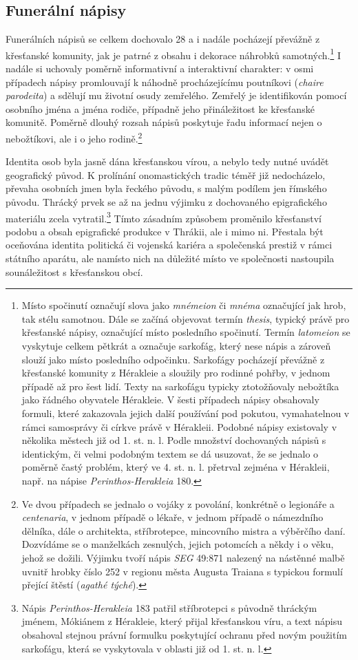 \subsection[funerální-nápisy-18]{Funerální nápisy}

Funerálních nápisů se celkem dochovalo 28 a i nadále pocházejí převážně z křesťanské komunity, jak je patrné z obsahu i dekorace náhrobků samotných.\footnote{Místo spočinutí označují slova jako {\em mnémeion} či {\em mnéma} označující jak hrob, tak stélu samotnou. Dále se začíná objevovat termín {\em thesis}, typický právě pro křesťanské nápisy, označující místo posledního spočinutí. Termín {\em latomeion} se vyskytuje celkem pětkrát a označuje sarkofág, který nese nápis a zároveň slouží jako místo posledního odpočinku. Sarkofágy pocházejí převážně z křesťanské komunity z Hérakleie a sloužily pro rodinné pohřby, v jednom případě až pro šest lidí. Texty na sarkofágu typicky ztotožňovaly nebožtíka jako řádného obyvatele Hérakleie. V šesti případech nápisy obsahovaly formuli, které zakazovala jejich další používání pod pokutou, vymahatelnou v rámci samosprávy či církve právě v Hérakleii. Podobné nápisy existovaly v několika městech již od 1. st. n. l. Podle množství dochovaných nápisů s identickým, či velmi podobným textem se dá usuzovat, že se jednalo o poměrně častý problém, který ve 4. st. n. l. přetrval zejména v Hérakleii, např. na nápise {\em Perinthos-Herakleia} 180.} I nadále si uchovaly poměrně informativní a interaktivní charakter: v osmi případech nápisy promlouvají k náhodně procházejícímu poutníkovi ({\em chaire parodeita}) a sdělují mu životní osudy zemřelého. Zemřelý je identifikován pomocí osobního jména a jména rodiče, případně jeho přináležitost ke křesťanské komunitě. Poměrně dlouhý rozsah nápisů poskytuje řadu informací nejen o nebožtíkovi, ale i o jeho rodině.\footnote{Ve dvou případech se jednalo o vojáky z povolání, konkrétně o legionáře a {\em centenaria}, v jednom případě o lékaře, v jednom případě o námezdního dělníka, dále o architekta, stříbrotepce, mincovního mistra a výběrčího daní. Dozvídáme se o manželkách zesnulých, jejich potomcích a někdy i o věku, jehož se dožili. Výjimku tvoří nápis {\em SEG} 49:871 nalezený na nástěnné malbě uvnitř hrobky číslo 252 v regionu města Augusta Traiana s typickou formulí přející štěstí ({\em agathé týché}).}

Identita osob byla jasně dána křesťanskou vírou, a nebylo tedy nutné uvádět geografický původ. K prolínání onomastických tradic téměř již nedocházelo, převaha osobních jmen byla řeckého původu, s malým podílem jen římského původu. Thrácký prvek se až na jednu výjimku z dochovaného epigrafického materiálu zcela vytratil.\footnote{Nápis {\em Perinthos-Herakleia} 183 patřil stříbrotepci s původně thráckým jménem, Mókiánem z Hérakleie, který přijal křesťanskou víru, a text nápisu obsahoval stejnou právní formulku poskytující ochranu před novým použitím sarkofágu, která se vyskytovala v oblasti již od 1. st. n. l.} Tímto zásadním způsobem proměnilo křesťanství podobu a obsah epigrafické produkce v Thrákii, ale i mimo ni. Přestala být oceňována identita politická či vojenská kariéra a společenská prestiž v rámci státního aparátu, ale namísto nich na důležité místo ve společnosti nastoupila sounáležitost s křesťanskou obcí.

